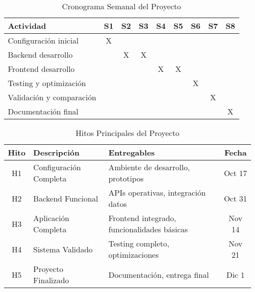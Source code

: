\begin{table}[H]
    \centering
    \small
    \begin{tabular}{|l|c|c|c|c|c|c|c|c|}
        \hline
        \textbf{Actividad} & \textbf{S1} & \textbf{S2} & \textbf{S3} & \textbf{S4} & \textbf{S5} & \textbf{S6} & \textbf{S7} & \textbf{S8} \\
        \hline
        Configuración inicial & X & & & & & & & \\
        \hline
        Backend desarrollo & & X & X & & & & & \\
        \hline
        Frontend desarrollo & & & & X & X & & & \\
        \hline
        Testing y optimización & & & & & & X & & \\
        \hline
        Validación y comparación & & & & & & & X & \\
        \hline
        Documentación final & & & & & & & & X \\
        \hline
    \end{tabular}
    \caption{Cronograma Semanal del Proyecto}
    \label{tab:cronograma_semanal}
\end{table}

\begin{table}[H]
    \centering
    \small
    \begin{tabular}{|c|l|l|c|}
        \hline
        \textbf{Hito} & \textbf{Descripción} & \textbf{Entregables} & \textbf{Fecha} \\
        \hline
        H1 & Configuración Completa & Ambiente de desarrollo, prototipos & Oct 17 \\
        \hline
        H2 & Backend Funcional & APIs operativas, integración datos & Oct 31 \\
        \hline
        H3 & Aplicación Completa & Frontend integrado, funcionalidades básicas & Nov 14 \\
        \hline
        H4 & Sistema Validado & Testing completo, optimizaciones & Nov 21 \\
        \hline
        H5 & Proyecto Finalizado & Documentación, entrega final & Dic 1 \\
        \hline
    \end{tabular}
    \caption{Hitos Principales del Proyecto}
    \label{tab:hitos}
\end{table}


